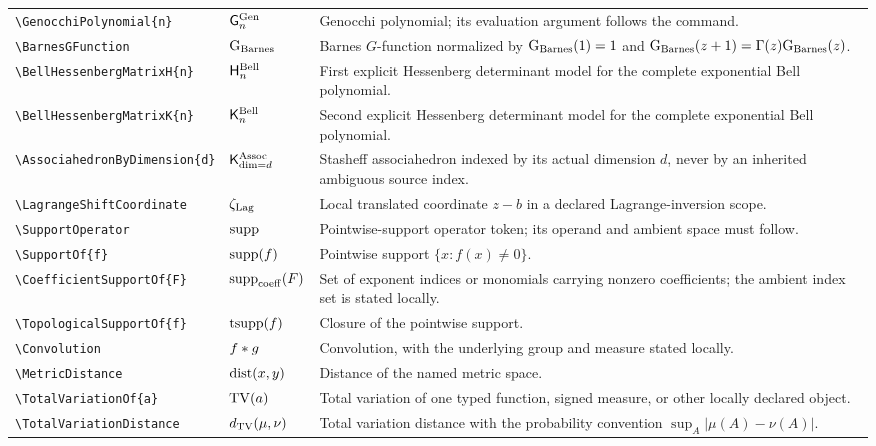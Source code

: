 \documentclass[11pt,oneside]{article}
\theoremstyle{definition}
\theoremstyle{remark}
\DeclareRobustCommand{\commandname}[1]{\texttt{\textbackslash#1}}
\begin{document}
\begin{longtable}{@{}S{0.35\textwidth}L{0.14\textwidth}L{0.45\textwidth}@{}}
\commandname{GenocchiPolynomial}\texttt{\{n\}} &
\(\mathsf{G}^{\mathrm{Gen}}_{n}\) & Genocchi polynomial; its evaluation argument
follows the command.\\
\commandname{BarnesGFunction} & \(\mathrm{G}_{\mathrm{Barnes}}\) & Barnes \(G\)-function
normalized by \(\mathrm{G}_{\mathrm{Barnes}}(1)=1\) and
\(\mathrm{G}_{\mathrm{Barnes}}(z+1)=\Gamma(z)\mathrm{G}_{\mathrm{Barnes}}(z)\).\\
\commandname{BellHessenbergMatrixH}\texttt{\{n\}} &
\(\mathsf{H}^{\mathrm{Bell}}_{n}\) & First explicit Hessenberg determinant model
for the complete exponential Bell polynomial.\\
\commandname{BellHessenbergMatrixK}\texttt{\{n\}} &
\(\mathsf{K}^{\mathrm{Bell}}_{n}\) & Second explicit Hessenberg determinant model
for the complete exponential Bell polynomial.\\
\commandname{AssociahedronByDimension}\texttt{\{d\}} &
\(\mathsf{K}^{\mathrm{Assoc}}_{\dim=d}\) & Stasheff associahedron indexed by its
actual dimension \(d\), never by an inherited ambiguous source index.\\
\commandname{LagrangeShiftCoordinate} & \(\zeta_{\mathrm{Lag}}\) & Local
translated coordinate \(z-b\) in a declared Lagrange-inversion scope.\\
\commandname{SupportOperator} & $\operatorname{supp}$ & Pointwise-support operator token;
its operand and ambient space must follow.\\
\commandname{SupportOf}\texttt{\{f\}} & $\operatorname{supp}\!\left(f\right)$ & Pointwise support
$\{x:f(x)\ne0\}$.\\
\commandname{CoefficientSupportOf}\texttt{\{F\}} &
\(\operatorname{supp}_{\mathrm{coeff}}\!\left(F\right)\) & Set of exponent indices or monomials carrying
nonzero coefficients; the ambient index set is stated locally.\\
\commandname{TopologicalSupportOf}\texttt{\{f\}} & $\operatorname{tsupp}\!\left(f\right)$ & Closure
of the pointwise support.\\
\commandname{Convolution} & $f\mathbin{*} g$ & Convolution, with the underlying group and
measure stated locally.\\
\commandname{MetricDistance} & $\operatorname{dist}(x,y)$ & Distance of the named metric space.\\
\commandname{TotalVariationOf}\texttt{\{a\}} & $\operatorname{TV}\!\left(a\right)$ & Total
variation of one typed function, signed measure, or other locally declared object.\\
\commandname{TotalVariationDistance} & $d_{\mathrm{TV}}(\mu,\nu)$ & Total
variation distance with the probability convention $\sup_A|\mu(A)-\nu(A)|$.\\

\end{longtable}
\end{document}
